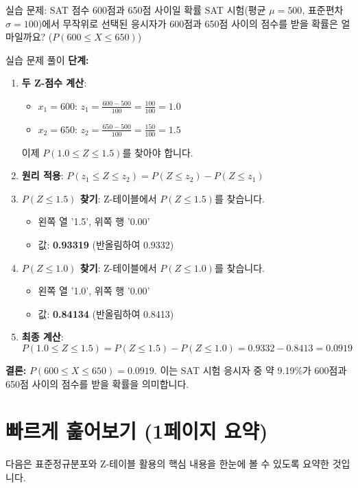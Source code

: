 \documentclass[11pt,a4paper]{article}
\begin{document}
\begin{examplebox}{실습 문제: SAT 점수 600점과 650점 사이일 확률}
SAT 시험(평균 $\mu=500$, 표준편차 $\sigma=100$)에서 무작위로 선택된 응시자가 600점과 650점 사이의 점수를 받을 확률은 얼마일까요? ($P(600 \le X \le 650)$)
\end{examplebox}

\begin{examplebox}{실습 문제 풀이}
\textbf{단계:}
\begin{enumerate}
    \item \textbf{두 Z-점수 계산}:
    \begin{itemize}
        \item $x_1 = 600$: $z_1 = \frac{600 - 500}{100} = \frac{100}{100} = 1.0$
        \item $x_2 = 650$: $z_2 = \frac{650 - 500}{100} = \frac{150}{100} = 1.5$
    \end{itemize}
    이제 $P(1.0 \le Z \le 1.5)$를 찾아야 합니다.
    \item \textbf{원리 적용}: $P(z_1 \le Z \le z_2) = P(Z \le z_2) - P(Z \le z_1)$
    \item \textbf{$P(Z \le 1.5)$ 찾기}: Z-테이블에서 $P(Z \le 1.5)$를 찾습니다.
    \begin{itemize}
        \item 왼쪽 열 '1.5', 위쪽 행 '0.00'
        \item 값: \textbf{0.93319} (반올림하여 0.9332)
    \end{itemize}
    \item \textbf{$P(Z \le 1.0)$ 찾기}: Z-테이블에서 $P(Z \le 1.0)$를 찾습니다.
    \begin{itemize}
        \item 왼쪽 열 '1.0', 위쪽 행 '0.00'
        \item 값: \textbf{0.84134} (반올림하여 0.8413)
    \end{itemize}
    \item \textbf{최종 계산}:
    \[ P(1.0 \le Z \le 1.5) = P(Z \le 1.5) - P(Z \le 1.0) = 0.9332 - 0.8413 = 0.0919 \]
\end{enumerate}
\textbf{결론:} $P(600 \le X \le 650) = 0.0919$. 이는 SAT 시험 응시자 중 약 9.19\%가 600점과 650점 사이의 점수를 받을 확률을 의미합니다.
\end{examplebox}

\newpage
\section*{빠르게 훑어보기 (1페이지 요약)}
다음은 표준정규분포와 Z-테이블 활용의 핵심 내용을 한눈에 볼 수 있도록 요약한 것입니다.
\end{document}
